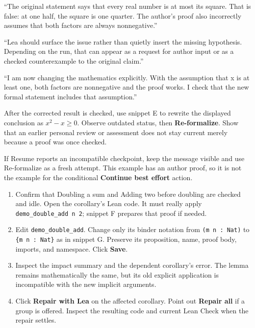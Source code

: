 \say
``The original statement says that every real number is at most its square.
That is false: at one half, the square is one quarter. The author's proof
also incorrectly assumes that both factors are always nonnegative.''

``Lea should surface the issue rather than quietly insert the missing
hypothesis. Depending on the run, that can appear as a request for author
input or as a checked counterexample to the original claim.''

``I am now changing the mathematics explicitly. With the assumption that
x is at least one, both factors are nonnegative and the proof works.
I check that the new formal statement includes that assumption.''

After the corrected result is checked, use snippet E to rewrite the displayed
conclusion as $x^2-x\ge0$. Observe outdated status, then \textbf{Re-formalize}.
Show that an earlier personal review or assessment does not stay current
merely because a proof was once checked.

\fallback
If Resume reports an incompatible checkpoint, keep the message visible and use
Re-formalize as a fresh attempt. This example has an author proof, so it is not
the example for the conditional \textbf{Continue best effort} action.

\clearpage
{}

\click
\begin{enumerate}
  \item Confirm that Doubling a sum and Adding two before doubling are checked
    and idle. Open the corollary's Lean code. It must really apply
    \texttt{demo\_double\_add n 2}; snippet F prepares that proof if needed.
  \item Edit \texttt{demo\_double\_add}. Change only its binder notation from
    \texttt{(m n : Nat)} to \texttt{\{m n : Nat\}} as in snippet G. Preserve its
    proposition, name, proof body, imports, and namespace. Click \textbf{Save}.
  \item Inspect the impact summary and the dependent corollary's error. The
    lemma remains mathematically the same, but its old explicit application is
    incompatible with the new implicit arguments.
  \item Click \textbf{Repair with Lea} on the affected corollary. Point out
    \textbf{Repair all} if a group is offered. Inspect the resulting code and
    current Lean Check when the repair settles.
\end{enumerate}

